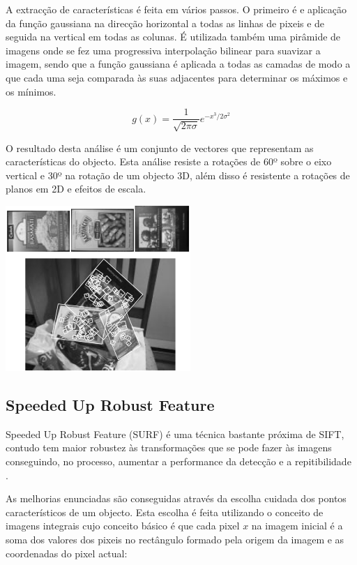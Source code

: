 A extracção de características é feita em vários passos. O primeiro é e
aplicação da função gaussiana na direcção horizontal a todas as linhas de pixeis
 e de seguida na vertical em todas as colunas.
É utilizada também uma pirâmide de imagens onde se fez uma progressiva interpolação
bilinear para suavizar a imagem, sendo que  a função gaussiana é aplicada a
todas as camadas de modo a que cada uma seja comparada às suas adjacentes
para determinar os máximos e os mínimos.

\[
g(x) = \frac{1}{\sqrt{2\pi\sigma}}e^{-x^3 / 2 \sigma^2}
\]

O resultado desta análise é um conjunto de vectores que representam as
características do objecto. Esta análise resiste a rotações de 60º sobre
o eixo vertical e 30º na rotação de um objecto 3D, além disso é
resistente a rotações de planos em 2D e efeitos de escala.


\begin{center}
	\includegraphics[scale=1.00]{figures/sift_img.png}
	\label{fig:1}
\end{center}

\subsection[SURF]{Speeded Up Robust Feature}

Speeded Up Robust Feature (SURF) é uma técnica bastante próxima
de SIFT, contudo tem maior robustez às transformações que se pode
fazer às imagens conseguindo, no processo, aumentar a performance
da detecção e a repitibilidade \cite{citeulike:973069}.

As melhorias enunciadas são conseguidas através da escolha cuidada
dos pontos característicos de um objecto. Esta escolha é feita
utilizando o conceito de imagens integrais \cite{10.1109CVPR.2001.990517}
cujo conceito básico é que cada pixel $x$ na imagem inicial é a
soma dos valores dos pixeis no rectângulo formado pela origem da
imagem e as coordenadas do pixel actual:

